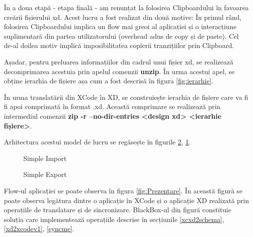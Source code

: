 În a doua etapă - etapa finală - am renunțat la folosirea Clipboardului în favoarea creării fișierului xd. 
Acest lucru a fost realizat din două motive: În primul rând, folosirea Clipboardului implica un flow mai greoi al aplicației și o interacțiune suplimentară din partea utilizatorului (overhead adus de copy și de paste). Cel de-al doilea motiv implică imposibilitatea copierii tranzițiilor prin Clipboard.

Așadar, pentru preluarea informațiilor din cadrul unui fișier xd, se realizează decomprimarea acestuia prin apelul comenzii \textbf{unzip}. În urma acestui apel, se obține ierarhia de fișiere așa cum a fost descrisă în figura \ref{fig:ierarhie}.

În urma translatării din XCode în XD, se construiește ierarhia de fișiere care va fi fi apoi comprimată în format .xd. Această comprimare se realizează prin intermediul comenzii \textbf{zip -r --no-dir-entries <design xd> <ierarhie fișiere>}. 

Arhitectura acestui model de lucru se regăsește în figurile \ref{fig:Export}, \ref{fig:Import}.

\begin{figure}[!htbp]
\centering
{}
\caption{Simple Import} \label{fig:Import}
\end{figure}

\begin{figure}[!htbp]
\centering
{}
\caption{Simple Export} \label{fig:Export}
\end{figure}

Flow-ul aplicației se poate observa în figura \ref{fig:Prezentare}. În această figură se poate observa legătura dintre o aplicație în XCode și o aplicație XD realizată prin operațiile de translatare și de sincronizare. BlackBox-ul din figură constituie soluția care implementează operațiile descrise în secțiunile \ref{xcxd2schema}, \ref{xd2xcodev1}, \ref{syncme}.

